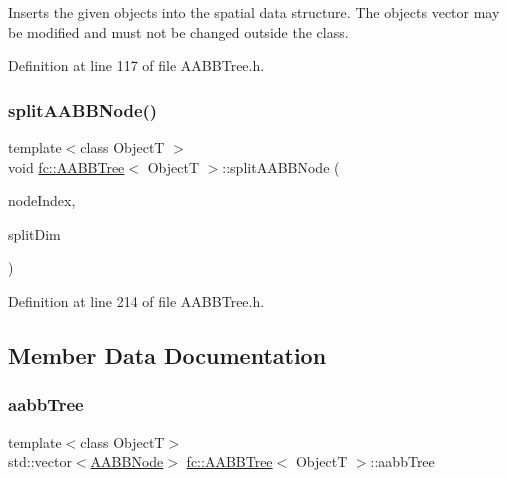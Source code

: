 Inserts the given objects into the spatial data structure. The objects vector may be modified and must not be changed outside the class. 

Definition at line 117 of file A\+A\+B\+B\+Tree.\+h.

\mbox{\label{classfc_1_1AABBTree_a01f4466619083a8820f721cff76831dc}} 
\subsubsection{\texorpdfstring{split\+A\+A\+B\+B\+Node()}{splitAABBNode()}}
{\footnotesize\ttfamily template$<$class ObjectT $>$ \\
void \hyperlink{classfc_1_1AABBTree}{fc\+::\+A\+A\+B\+B\+Tree}$<$ ObjectT $>$\+::split\+A\+A\+B\+B\+Node (\begin{DoxyParamCaption}\item[{\hyperlink{classfc_1_1AABBTree_a18706db5b992d8875e08dc325abf3811}{aabb\+Tree\+\_\+size\+\_\+type}}]{node\+Index,  }\item[{int}]{split\+Dim }\end{DoxyParamCaption})\hspace{0.3cm}{\ttfamily [private]}}



Definition at line 214 of file A\+A\+B\+B\+Tree.\+h.



\subsection{Member Data Documentation}
\mbox{\label{classfc_1_1AABBTree_a971132f54e3a462458362901fac9b37f}} 
\subsubsection{\texorpdfstring{aabb\+Tree}{aabbTree}}
{\footnotesize\ttfamily template$<$class ObjectT$>$ \\
std\+::vector$<$\hyperlink{structfc_1_1AABBTree_1_1AABBNode}{A\+A\+B\+B\+Node}$>$ \hyperlink{classfc_1_1AABBTree}{fc\+::\+A\+A\+B\+B\+Tree}$<$ ObjectT $>$\+::aabb\+Tree\hspace{0.3cm}{\ttfamily [private]}}



